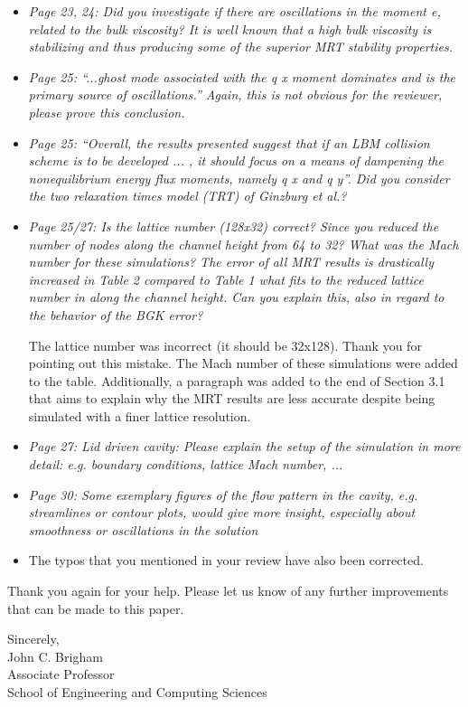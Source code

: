 \documentclass{article}
\begin{document}
\begin{itemize}
	\item \emph{Page 23, 24: Did you investigate if there are oscillations in the moment e, related to
		the bulk viscosity? It is well known that a high bulk viscosity is stabilizing and thus
		producing some of the superior MRT stability properties.}
	
	\item \emph{Page 25: ``...ghost mode associated with the q x moment dominates and is the
		primary source of oscillations.'' Again, this is not obvious for the reviewer, please
		prove this conclusion.}
	
	\item \emph{Page 25: ``Overall, the results presented suggest that if an LBM collision scheme is to
		be developed ... , it should focus on a means of dampening the nonequilibrium
		energy flux moments, namely q x and q y''. Did you consider the two relaxation times
		model (TRT) of Ginzburg et al.?}
	
	\item \emph{Page 25/27: Is the lattice number (128x32) correct? Since you reduced the number
		of nodes along the channel height from 64 to 32? What was the Mach number for
		these simulations? The error of all MRT results is drastically increased in Table 2
		compared to Table 1 what fits to the reduced lattice number in along the channel
		height. Can you explain this, also in regard to the behavior of the BGK error?}
	
	The lattice number was incorrect (it should be 32x128).
	Thank you for pointing out this mistake.
	The Mach number of these simulations were added to the table.
	Additionally, a paragraph was added to the end of Section 3.1 that aims to explain why the MRT results are less accurate despite being simulated with a finer lattice resolution.
	
	\item \emph{Page 27: Lid driven cavity: Please explain the setup of the simulation in more detail:
		e.g. boundary conditions, lattice Mach number, ...}
	
	\item \emph{Page 30: Some exemplary figures of the flow pattern in the cavity, e.g. streamlines or
		contour plots, would give more insight, especially about smoothness or oscillations in
		the solution}
	
	\item The typos that you mentioned in your review have also been corrected.
	
	\end{itemize}

Thank you again for your help. Please let us know of any further improvements that can be made to this paper.

\vspace{1in}
\noindent Sincerely, \\
\indent John C. Brigham \vspace{0.1in}\\
\indent Associate Professor \\
\indent School of Engineering and Computing Sciences
	
\end{document}
